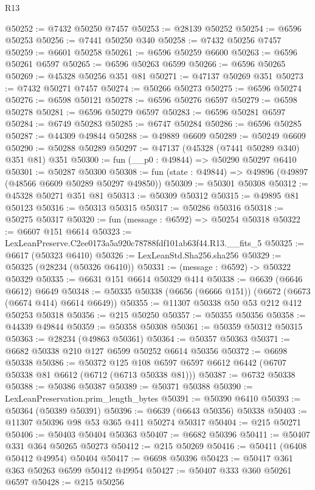 \begin{lexlean}{R13}
\begin{coremodule}
@50252 := @7432 @50250 @7457
@50253 := @28139 @50252
@50254 := @6596 @50253
@50256 := @7441 @50250 @340
@50258 := @7432 @50256 @7457
@50259 := @6601 @50258
@50261 := @6596 @50259 @6600
@50263 := @6596 @50261 @6597
@50265 := @6596 @50263 @6599
@50266 := @6596 @50265
@50269 := @45328 @50256 @351 @81
@50271 := @47137 @50269 @351
@50273 := @7432 @50271 @7457
@50274 := @50266 @50273
@50275 := @6596 @50274
@50276 := @6598 @50121
@50278 := @6596 @50276 @6597
@50279 := @6598 @50278
@50281 := @6596 @50279 @6597
@50283 := @6596 @50281 @6597
@50284 := @6749 @50283
@50285 := @6747 @50284
@50286 := @6596 @50285
@50287 := @44309 @49844
@50288 := @49889 @6609
@50289 := @50249 @6609
@50290 := @50288 @50289
@50297 := @47137 (@45328 (@7441 @50289 @340) @351 @81) @351
@50300 := fun (__p0 : @49844) => @50290 @50297 @6410
@50301 := @50287 @50300
@50308 := fun (state : @49844) => @49896 (@49897 (@48566 @6609 @50289 @50297 @49850))
@50309 := @50301 @50308
@50312 := @45328 @50271 @351 @81
@50313 := @50309 @50312
@50315 := @49895 @81 @50123
@50316 := @50313 @50315
@50317 := @50286 @50316
@50318 := @50275 @50317
@50320 := fun (message : @6592) => @50254 @50318
@50322 := @6607 @151 @6614
@50323 := LexLeanPreserve.C2ee0173a5a920c78788fdf101ab63f44.R13.__fits_5
@50325 := @6617 (@50323 @6410)
@50326 := LexLeanStd.Sha256.sha256
@50329 := @50325 (@28234 (@50326 @6410))
@50331 := (message : @6592) -> @50322 @50329
@50335 := @6631 @151 @6614 @50329 @414
@50338 := @6639 (@6646 @6612) @6649
@50348 := @50335 @50338 (@6656 (@6666 @151)) (@6672 (@6673 (@6674 @414) @6614 @6649))
@50355 := @11307 @50338 @50 @53 @212 @412 @50253 @50318
@50356 := @215 @50250
@50357 := @50355 @50356
@50358 := @44339 @49844
@50359 := @50358 @50308
@50361 := @50359 @50312 @50315
@50363 := @28234 (@49863 @50361)
@50364 := @50357 @50363
@50371 := @6682 @50338 @210 @127 @6599 @50252 @6614 @50356
@50372 := @6698 @50338
@50386 := @50372
    @125
    @108
    @6597
    @6597
    @6612
    @6442
    (@6707 @50338 @81 @6612 (@6712 (@6713 @50338 @81)))
@50387 := @6732 @50338
@50388 := @50386 @50387
@50389 := @50371 @50388
@50390 := LexLeanPreservation.prim_length_bytes
@50391 := @50390 @6410
@50393 := @50364 (@50389 @50391)
@50396 := @6639 (@6643 @50356) @50338
@50403 := @11307 @50396 @98 @53 @365 @411 @50274 @50317
@50404 := @215 @50271
@50406 := @50403 @50404 @50363
@50407 := @6682 @50396
@50411 := @50407 @331 @364 @50265 @50273
@50412 := @215 @50269
@50416 := @50411 (@6408 @50412 @49954) @50404
@50417 := @6698 @50396
@50423 := @50417 @361 @363 @50263 @6599 @50412 @49954
@50427 := @50407 @333 @360 @50261 @6597
@50428 := @215 @50256

\end{coremodule}
\end{lexlean}
